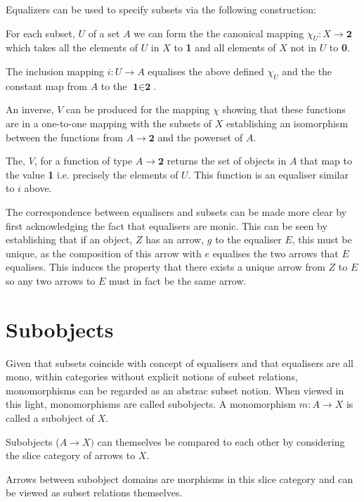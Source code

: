 \documentclass[a4paper,12pt]{article}
\begin{document}
Equalizers can be used to specify subsets via the following construction:

For each subset, $U$ of a set $A$ we can form the the canonical mapping
$\chi_{U}: X \rightarrow \textbf{2}$ which takes all the elements of $U$ in
$X$ to \textbf{1} and all elements of $X$ not in $U$ to \textbf{0}.

The inclusion mapping $i: U \rightarrow A$ equalises the above defined
$\chi_{U}$ and the the constant map from $A$ to the $\textbf{1} \in \textbf{2}$.

An inverse, $V$ can be produced for the mapping $\chi$ showing that these
functions are in a one-to-one mapping with the subsets of $X$ establishing an
isomorphism between the functions from $A \rightarrow \textbf{2}$ and the
powerset of $A$.

The, $V$, for a function of type $A \rightarrow \textbf{2}$ returns the set of
objects in $A$ that map to the value \textbf{1} i.e. precisely the elements of
$U$. This function is an equaliser similar to $i$ above.

The correspondence between equalisers and subsets can be made more clear by
first acknowledging the fact that equalisers are monic. This can be seen by
establishing that if an object, $Z$ has an arrow, $g$ to the equaliser $E$, this
must be unique, as the composition of this arrow with $e$ equalises the two
arrows that $E$ equalises. This induces the property that there exists a unique
arrow from $Z$ to $E$ so any two arrows to $E$ must in fact be the same arrow.

\section{Subobjects}

Given that subsets coincide with concept of equalisers and that equalisers are
all mono, within categories without explicit notions of subset relations,
monomorphisms can be regarded as an abstrac subset notion. When viewed in this
light, monomorphisms are called subobjects. A monomorphism $m: A \rightarrow X$
is called a subobject of $X$.

Subobjects ($A \rightarrow X)$ can themselves be compared to each other by considering the
 slice category of arrows to $X$.

Arrows between subobject domains are morphisms in this slice category and can be
viewed as subset relations themselves.
\end{document}
